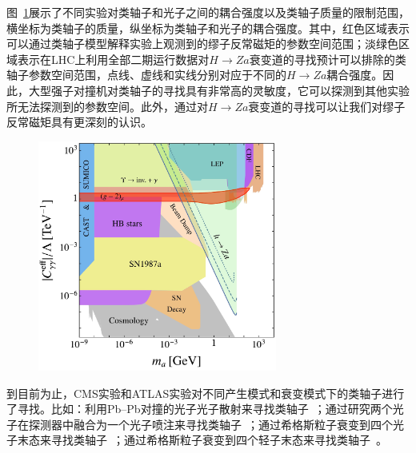 图~\ref{fig:c01f04}展示了不同实验对类轴子和光子之间的耦合强度以及类轴子质量的限制范围，横坐标为类轴子的质量，纵坐标为类轴子和光子的耦合强度。其中，红色区域表示可以通过类轴子模型解释实验上观测到的缪子反常磁矩的参数空间范围；淡绿色区域表示在LHC上利用全部二期运行数据对$H\rightarrow Za$衰变道的寻找预计可以排除的类轴子参数空间范围，点线、虚线和实线分别对应于不同的$H\rightarrow Za$耦合强度。因此，大型强子对撞机对类轴子的寻找具有非常高的灵敏度，它可以探测到其他实验所无法探测到的参数空间。此外，通过对$H\rightarrow Za$衰变道的寻找可以让我们对缪子反常磁矩具有更深刻的认识。

\begin{figure}[!htbp]
    \centering
    \includegraphics[width=0.70\textwidth]{figures/chapter01/ALP_run2.jpg}
    \label{fig:c01f04}
\end{figure}

到目前为止，CMS实验和ATLAS实验对不同产生模式和衰变模式下的类轴子进行了寻找。比如：利用Pb--Pb对撞的光子光子散射来寻找类轴子~\cite{aad2021measurement,sirunyan2019evidence}；通过研究两个光子在探测器中融合为一个光子喷注来寻找类轴子~\cite{cms2022search,atlas2022search}；通过希格斯粒子衰变到四个光子末态来寻找类轴子~\cite{CMS_ALP_1}；通过希格斯粒子衰变到四个轻子末态来寻找类轴子~\cite{CMS_ALP_3}。

